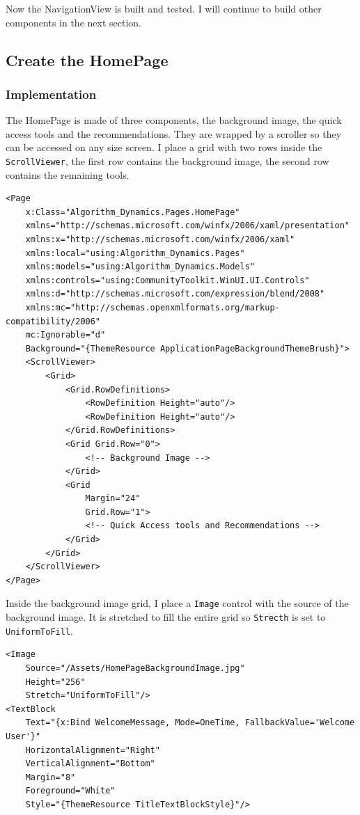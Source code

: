 \documentclass[a4paper]{report}
\newcommand{\code}{\texttt}
\begin{document}
Now the NavigationView is built and tested. I will continue to build other components in the next section.

\subsection{Create the HomePage}

\subsubsection{Implementation}

The HomePage is made of three components, the background image, the quick access tools and the recommendations. They are wrapped by a scroller so they can be accessed on any size screen. I place a grid with two rows inside the \code{ScrollViewer}, the first row contains the background image, the second row contains the remaining tools. 

\begin{verbatim}
<Page
    x:Class="Algorithm_Dynamics.Pages.HomePage"
    xmlns="http://schemas.microsoft.com/winfx/2006/xaml/presentation"
    xmlns:x="http://schemas.microsoft.com/winfx/2006/xaml"
    xmlns:local="using:Algorithm_Dynamics.Pages"
    xmlns:models="using:Algorithm_Dynamics.Models"
    xmlns:controls="using:CommunityToolkit.WinUI.UI.Controls"
    xmlns:d="http://schemas.microsoft.com/expression/blend/2008"
    xmlns:mc="http://schemas.openxmlformats.org/markup-compatibility/2006"
    mc:Ignorable="d"
    Background="{ThemeResource ApplicationPageBackgroundThemeBrush}">
    <ScrollViewer>
        <Grid>
            <Grid.RowDefinitions>
                <RowDefinition Height="auto"/>
                <RowDefinition Height="auto"/>
            </Grid.RowDefinitions>
            <Grid Grid.Row="0">
                <!-- Background Image -->
            </Grid>
            <Grid 
                Margin="24"
                Grid.Row="1">
                <!-- Quick Access tools and Recommendations -->
            </Grid>
        </Grid>
    </ScrollViewer>
</Page>
\end{verbatim}

Inside the background image grid, I place a \code{Image} control with the source of the background image. It is stretched to fill the entire grid so \code{Strecth} is set to \code{UniformToFill}.

\begin{verbatim}
<Image 
    Source="/Assets/HomePageBackgroundImage.jpg" 
    Height="256"
    Stretch="UniformToFill"/>
<TextBlock 
    Text="{x:Bind WelcomeMessage, Mode=OneTime, FallbackValue='Welcome User'}"
    HorizontalAlignment="Right"
    VerticalAlignment="Bottom"
    Margin="8"
    Foreground="White"
    Style="{ThemeResource TitleTextBlockStyle}"/>
\end{verbatim}
\end{document}
